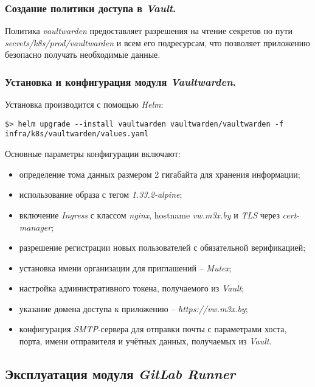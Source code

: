 \subsubsection{Создание политики доступа в \textit{Vault}.} Политика \textit{vaultwarden} предоставляет разрешения на чтение секретов по пути \textit{secrets/k8s/prod/vaultwarden} и всем его подресурсам, что позволяет приложению безопасно получать необходимые данные.

\subsubsection{Установка и конфигурация модуля \textit{Vaultwarden}.} Установка производится с помощью \textit{Helm}:

\begin{lstlisting}
$> helm upgrade --install vaultwarden vaultwarden/vaultwarden -f infra/k8s/vaultwarden/values.yaml
\end{lstlisting}

Основные параметры конфигурации включают:

\begin{itemize}
    \item определение тома данных размером 2 гигабайта для хранения информации;
    \item использование образа с тегом \textit{1.33.2-alpine};
    \item включение \textit{Ingress} с классом \textit{nginx}, hostname \textit{vw.m3x.by} и \textit{TLS} через \textit{cert-manager};
    \item разрешение регистрации новых пользователей с обязательной верификацией;
    \item установка имени организации для приглашений -- \textit{Mutex};
    \item настройка административного токена, получаемого из \textit{Vault};
    \item указание домена доступа к приложению -- \textit{https://vw.m3x.by};
    \item конфигурация \textit{SMTP}-сервера для отправки почты с параметрами хоста, порта, имени отправителя и учётных данных, получаемых из \textit{Vault}.
\end{itemize}



\subsection{Эксплуатация модуля \textit{GitLab Runner}}


